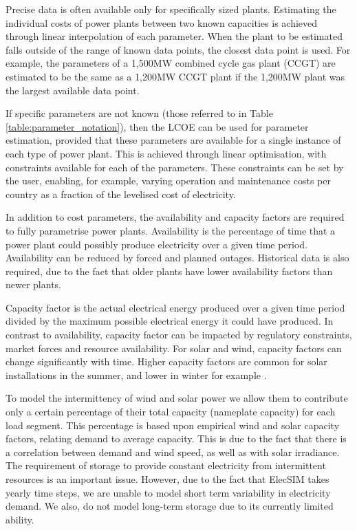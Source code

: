 Precise data is often available only for specifically sized plants. Estimating the individual costs of power plants between two known capacities is achieved through linear interpolation of each parameter. When the plant to be estimated falls outside of the range of known data points, the closest data point is used. For example, the parameters of a 1,500MW combined cycle gas plant (CCGT) are estimated to be the same as a 1,200MW CCGT plant if the 1,200MW plant was the largest available data point. 

If specific parameters are not known (those referred to in Table \ref{table:parameter_notation}), then the LCOE can be used for parameter estimation, provided that these parameters are available for a single instance of each type of power plant. This is achieved through linear optimisation, with constraints available for each of the parameters. These constraints can be set by the user, enabling, for example, varying operation and maintenance costs per country as a fraction of the levelised cost of electricity.


In addition to cost parameters, the availability and capacity factors are required to fully parametrise power plants. Availability is the percentage of time that a power plant could possibly produce electricity over a given time period. Availability can be reduced by forced and planned outages. Historical data is also required, due to the fact that older plants have lower availability factors than newer plants.

Capacity factor is the actual electrical energy produced over a given time period divided by the maximum possible electrical energy it could have produced. In contrast to availability, capacity factor can be impacted by regulatory constraints, market forces and resource availability. For solar and wind, capacity factors can change significantly with time. Higher capacity factors are common for solar installations in the summer, and lower in winter for example \cite{Stoft2002}. 

To model the intermittency of wind and solar power we allow them to contribute only a certain percentage of their total capacity (nameplate capacity) for each load segment. This percentage is based upon empirical wind and solar capacity factors, relating demand to average capacity. This is due to the fact that there is a correlation between demand and wind speed, as well as with solar irradiance. The requirement of storage to provide constant electricity from intermittent resources is an important issue. However, due to the fact that ElecSIM takes yearly time steps, we are unable to model short term variability in electricity demand. We also, do not model long-term storage due to its currently limited ability. 

